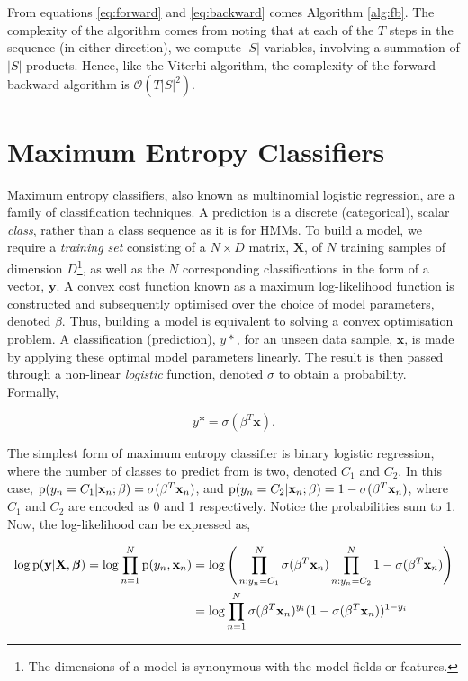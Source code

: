 From equations \ref{eq:forward} and \ref{eq:backward} comes Algorithm \ref{alg:fb}. The complexity of the algorithm comes from noting that at each of the $T$ steps in the sequence (in either direction), we compute $|S|$ variables, involving a summation of $|S|$ products. Hence, like the Viterbi algorithm, the complexity of the forward-backward algorithm is $\mathcal{O}(T|S|^2)$.

\section{Maximum Entropy Classifiers}

Maximum entropy classifiers, also known as multinomial logistic regression, are a family of classification techniques.  A prediction is a discrete (categorical), scalar \emph{class}, rather than a class sequence as it is for HMMs. To build a model, we require a \emph{training set} consisting of a $N \times D$ matrix, $\mathbf{X}$, of $N$ training samples of dimension $D$\footnote{The dimensions of a model is synonymous with the model fields or features.}, as well as the $N$ corresponding classifications in the form of a vector, $\mathbf{y}$. A convex cost function known as a maximum log-likelihood function is constructed and subsequently optimised over the choice of model parameters, denoted $\beta$. Thus, building a model is equivalent to solving a convex optimisation problem. A classification (prediction), $y*$, for an unseen data sample, $\mathbf{x}$, is made by applying these optimal model parameters linearly. The result is then passed through a non-linear \emph{logistic} function, denoted $\sigma$ to obtain a probability. Formally,

\begin{equation}
y* = \sigma(\beta^T\mathbf{x}).
\label{eq:logisticprediction}
\end{equation}

The simplest form of maximum entropy classifier is binary logistic regression, where the number of classes to predict from is two, denoted $C_1$ and $C_2$. In this case, $\text{p}(y_n = C_1|\mathbf{x}_n;\beta) = \sigma(\beta^T\mathbf{x}_n)$, and $\text{p}(y_n = C_2|\mathbf{x}_n;\beta) = 1 - \sigma(\beta^T\mathbf{x}_n)$, where $C_1$ and $C_2$ are encoded as 0 and 1 respectively. Notice the probabilities sum to 1. Now, the log-likelihood can be expressed as,

\begin{equation}
\begin{aligned}
\log\text{p}(\mathbf{y}|\mathbf{X}, \boldsymbol\beta) = \log\prod_{n=1}^N \text{p}(y_n, \mathbf{x}_n)
&= \log\Bigg(\prod_{n:y_n = C_1}^N \sigma(\beta^T\mathbf{x}_n) \prod_{n:y_n = C_2}^N 1 - \sigma(\beta^T\mathbf{x}_n)\Bigg) \\
&=  \log\prod_{n = 1}^N \sigma(\beta^T\mathbf{x}_n)^{y_i}(1 - \sigma(\beta^T\mathbf{x}_n))^{1 - y_i}
\end{aligned}
\label{eq:logistic2}
\end{equation}

